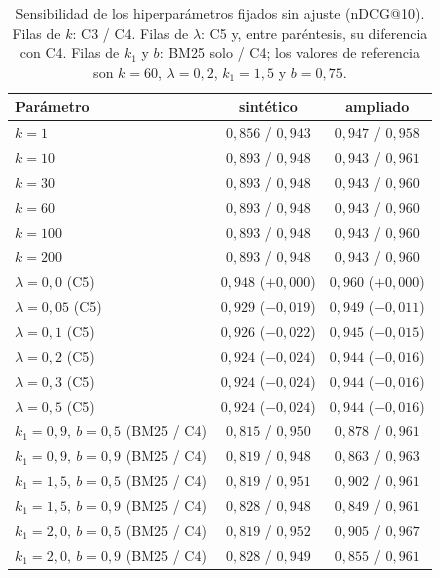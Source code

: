 \documentclass[11pt,letterpaper]{article}
\numberwithin{equation}{section}
\begin{document}
\begin{table}[htbp]
\centering
\footnotesize
\setlength{\tabcolsep}{5pt}
\renewcommand{\arraystretch}{1.25}
\caption{Sensibilidad de los hiperparámetros fijados sin ajuste (nDCG@10). Filas de $k$: C3 / C4. Filas de $\lambda$: C5 y, entre paréntesis, su diferencia con C4. Filas de $k_1$ y $b$: BM25 solo / C4; los valores de referencia son $k=60$, $\lambda=0{,}2$, $k_1=1{,}5$ y $b=0{,}75$.}
\label{tab:sensibilidad}
\begin{tabularx}{\textwidth}{@{}l C C@{}}
\toprule
\textbf{Parámetro} & \textbf{sintético} & \textbf{ampliado} \\
\midrule
$k=1$ & $0{,}856$ / $0{,}943$ & $0{,}947$ / $0{,}958$ \\
$k=10$ & $0{,}893$ / $0{,}948$ & $0{,}943$ / $0{,}961$ \\
$k=30$ & $0{,}893$ / $0{,}948$ & $0{,}943$ / $0{,}960$ \\
$k=60$ & $0{,}893$ / $0{,}948$ & $0{,}943$ / $0{,}960$ \\
$k=100$ & $0{,}893$ / $0{,}948$ & $0{,}943$ / $0{,}960$ \\
$k=200$ & $0{,}893$ / $0{,}948$ & $0{,}943$ / $0{,}960$ \\
$\lambda=0{,}0$ (C5) & $0{,}948$ ($+0{,}000$) & $0{,}960$ ($+0{,}000$) \\
$\lambda=0{,}05$ (C5) & $0{,}929$ ($-0{,}019$) & $0{,}949$ ($-0{,}011$) \\
$\lambda=0{,}1$ (C5) & $0{,}926$ ($-0{,}022$) & $0{,}945$ ($-0{,}015$) \\
$\lambda=0{,}2$ (C5) & $0{,}924$ ($-0{,}024$) & $0{,}944$ ($-0{,}016$) \\
$\lambda=0{,}3$ (C5) & $0{,}924$ ($-0{,}024$) & $0{,}944$ ($-0{,}016$) \\
$\lambda=0{,}5$ (C5) & $0{,}924$ ($-0{,}024$) & $0{,}944$ ($-0{,}016$) \\
$k_1=0{,}9,\ b=0{,}5$ (BM25 / C4) & $0{,}815$ / $0{,}950$ & $0{,}878$ / $0{,}961$ \\
$k_1=0{,}9,\ b=0{,}9$ (BM25 / C4) & $0{,}819$ / $0{,}948$ & $0{,}863$ / $0{,}963$ \\
$k_1=1{,}5,\ b=0{,}5$ (BM25 / C4) & $0{,}819$ / $0{,}951$ & $0{,}902$ / $0{,}961$ \\
$k_1=1{,}5,\ b=0{,}9$ (BM25 / C4) & $0{,}828$ / $0{,}948$ & $0{,}849$ / $0{,}961$ \\
$k_1=2{,}0,\ b=0{,}5$ (BM25 / C4) & $0{,}819$ / $0{,}952$ & $0{,}905$ / $0{,}967$ \\
$k_1=2{,}0,\ b=0{,}9$ (BM25 / C4) & $0{,}828$ / $0{,}949$ & $0{,}855$ / $0{,}961$ \\
\bottomrule
\end{tabularx}
\end{table}
\end{document}
